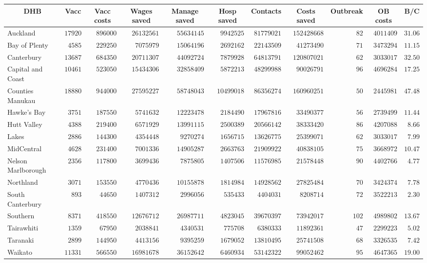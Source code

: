 \documentclass{article}
\begin{document}
\begin{table}\small
\begin{center}
\begin{tabular}{lrrrrrrrrrr}
\hline\hline
\multicolumn{1}{c}{DHB}&\multicolumn{1}{c}{Vacc}&\multicolumn{1}{c}{Vacc costs}&\multicolumn{1}{c}{Wages saved}&\multicolumn{1}{c}{Manage saved}&\multicolumn{1}{c}{Hosp saved}&\multicolumn{1}{c}{Contacts}&\multicolumn{1}{c}{Costs saved}&\multicolumn{1}{c}{Outbreak}&\multicolumn{1}{c}{OB costs}&\multicolumn{1}{c}{B/C}\tabularnewline
\hline
Auckland&$17920$&$896000$&$26132561$&$55634145$&$ 9942525$&$81779021$&$152428668$&$ 82$&$4011409$&$31.06$\tabularnewline
Bay of Plenty&$ 4585$&$229250$&$ 7075979$&$15064196$&$ 2692162$&$22143509$&$ 41273490$&$ 71$&$3473294$&$11.15$\tabularnewline
Canterbury&$13687$&$684350$&$20711307$&$44092724$&$ 7879928$&$64813791$&$120807021$&$ 62$&$3033017$&$32.50$\tabularnewline
Capital and Coast&$10461$&$523050$&$15434306$&$32858409$&$ 5872213$&$48299988$&$ 90026791$&$ 96$&$4696284$&$17.25$\tabularnewline
Counties Manukau&$18880$&$944000$&$27595227$&$58748043$&$10499018$&$86356274$&$160960251$&$ 50$&$2445981$&$47.48$\tabularnewline
Hawke's Bay&$ 3751$&$187550$&$ 5741632$&$12223478$&$ 2184490$&$17967816$&$ 33490377$&$ 56$&$2739499$&$11.44$\tabularnewline
Hutt Valley&$ 4388$&$219400$&$ 6571929$&$13991115$&$ 2500389$&$20566142$&$ 38333420$&$ 86$&$4207088$&$ 8.66$\tabularnewline
Lakes&$ 2886$&$144300$&$ 4354448$&$ 9270274$&$ 1656715$&$13626775$&$ 25399071$&$ 62$&$3033017$&$ 7.99$\tabularnewline
MidCentral&$ 4628$&$231400$&$ 7001336$&$14905287$&$ 2663763$&$21909922$&$ 40838105$&$ 75$&$3668972$&$10.47$\tabularnewline
Nelson Marlborough&$ 2356$&$117800$&$ 3699436$&$ 7875805$&$ 1407506$&$11576985$&$ 21578448$&$ 90$&$4402766$&$ 4.77$\tabularnewline
Northland&$ 3071$&$153550$&$ 4770436$&$10155878$&$ 1814984$&$14928562$&$ 27825484$&$ 70$&$3424374$&$ 7.78$\tabularnewline
South Canterbury&$  893$&$ 44650$&$ 1407312$&$ 2996056$&$  535433$&$ 4404031$&$  8208714$&$ 72$&$3522213$&$ 2.30$\tabularnewline
Southern&$ 8371$&$418550$&$12676712$&$26987711$&$ 4823045$&$39670397$&$ 73942017$&$102$&$4989802$&$13.67$\tabularnewline
Tairawhiti&$ 1359$&$ 67950$&$ 2038841$&$ 4340531$&$  775708$&$ 6380333$&$ 11892361$&$ 47$&$2299223$&$ 5.02$\tabularnewline
Taranaki&$ 2899$&$144950$&$ 4413156$&$ 9395259$&$ 1679052$&$13810495$&$ 25741508$&$ 68$&$3326535$&$ 7.42$\tabularnewline
Waikato&$11331$&$566550$&$16981678$&$36152642$&$ 6460934$&$53142322$&$ 99052462$&$ 95$&$4647365$&$19.00$\tabularnewline

\end{tabular}
\end{center}
\end{table}
\end{document}
